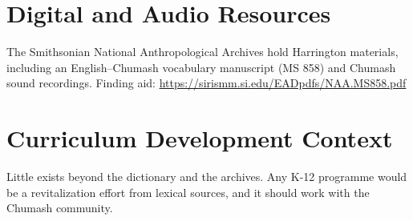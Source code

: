 \documentclass[12pt]{article}
\begin{document}
\section{Digital and Audio Resources}
The Smithsonian National Anthropological Archives hold Harrington materials, including an English--Chumash vocabulary manuscript (MS 858) and Chumash sound recordings. Finding aid: \url{https://sirismm.si.edu/EADpdfs/NAA.MS858.pdf}

\section{Curriculum Development Context}
Little exists beyond the dictionary and the archives. Any K-12 programme would be a revitalization effort from lexical sources, and it should work with the Chumash community.
\end{document}
